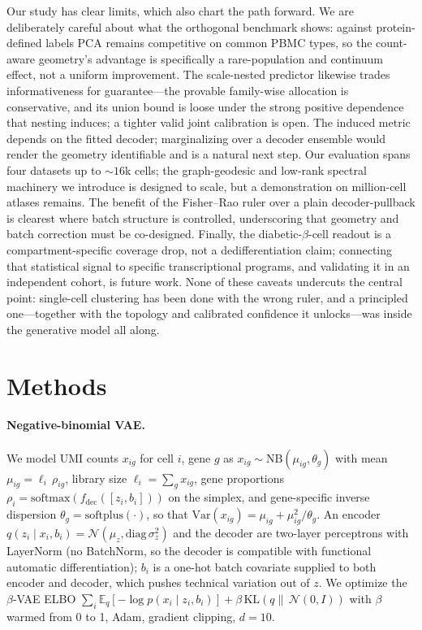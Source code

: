 \documentclass[11pt]{article}
\begin{document}
Our study has clear limits, which also chart the path forward. We are deliberately careful about what
the orthogonal benchmark shows: against protein-defined labels PCA remains competitive on common PBMC
types, so the count-aware geometry's advantage is specifically a rare-population and continuum effect,
not a uniform improvement. The scale-nested predictor likewise trades informativeness for guarantee---the
provable family-wise allocation is conservative, and its union bound is loose under the strong positive
dependence that nesting induces; a tighter valid joint calibration is open. The induced metric depends
on the fitted decoder; marginalizing over a decoder ensemble \citep{syrota2024decoder} would render the
geometry identifiable and is a natural next step. Our evaluation spans four datasets up to $\sim\!16$k cells;
the graph-geodesic and low-rank spectral machinery we introduce is designed to scale, but a
demonstration on million-cell atlases remains. The benefit of the Fisher--Rao ruler over a plain
decoder-pullback is clearest where batch structure is controlled, underscoring that geometry and batch
correction must be co-designed. Finally, the diabetic-$\beta$-cell readout is a compartment-specific
coverage drop, not a dedifferentiation claim; connecting that statistical signal to specific
transcriptional programs, and validating it in an independent cohort, is future work. None of these
caveats undercuts the central point: single-cell clustering has been done with the wrong ruler, and a
principled one---together with the topology and calibrated confidence it unlocks---was inside the
generative model all along.

\section{Methods}

\paragraph{Negative-binomial VAE.} We model UMI counts $x_{ig}$ for cell $i$, gene $g$ as
$x_{ig}\sim\mathrm{NB}(\mu_{ig},\theta_g)$ with mean $\mu_{ig}=\ell_i\,\rho_{ig}$, library size
$\ell_i=\sum_g x_{ig}$, gene proportions $\rho_i=\mathrm{softmax}(f_{\text{dec}}([z_i,b_i]))$ on the
simplex, and gene-specific inverse dispersion $\theta_g=\mathrm{softplus}(\cdot)$, so that
$\mathrm{Var}(x_{ig})=\mu_{ig}+\mu_{ig}^2/\theta_g$. An encoder $q(z_i\mid x_i,b_i)=\mathcal{N}(\mu_z,\mathrm{diag}\,\sigma_z^2)$
and the decoder are two-layer perceptrons with LayerNorm (no BatchNorm, so the decoder is compatible
with functional automatic differentiation); $b_i$ is a one-hot batch covariate supplied to both
encoder and decoder, which pushes technical variation out of $z$. We optimize the $\beta$-VAE ELBO
$\sum_i \mathbb{E}_q[-\log p(x_i\mid z_i,b_i)]+\beta\,\mathrm{KL}(q\|\,\mathcal{N}(0,I))$ with
$\beta$ warmed from 0 to 1, Adam, gradient clipping, $d=10$.
\end{document}
